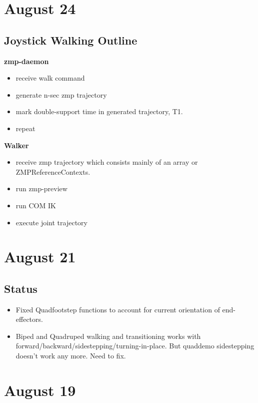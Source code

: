 \documentclass[letterpaper, 10 pt]{report}
\begin{document}
\section*{August 24}
\subsection*{Joystick Walking Outline}
\textbf{zmp-daemon}
\begin{itemize}
    \item receive walk command
    \item generate n-sec zmp trajectory
    \item mark double-support time in generated trajectory, T1. 
    \item repeat
\end{itemize}
\textbf{Walker}
\begin{itemize}
    \item receive zmp trajectory which consists mainly of an array or ZMPReferenceContexts. 
    \item run zmp-preview
    \item run COM IK
    \item execute joint trajectory
\end{itemize}

\section*{August 21}
\subsection*{Status}
\begin{itemize}
\item Fixed Quadfootstep functions to account for current orientation of end-effectors.
\item Biped and Quadruped walking and transitioning works with forward/backward/sidestepping/turning-in-place. But quaddemo sidestepping doesn't work any more. Need to fix.
\end{itemize}

\section*{August 19}
\end{document}
